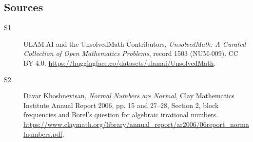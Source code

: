 \documentclass[11pt]{article}
\begin{document}
\subsection{Sources}
\begin{description}
\item[\hypertarget{source:1503:1}{S1}] ULAM.AI and the UnsolvedMath Contributors, \emph{UnsolvedMath: A Curated Collection of Open Mathematics Problems}, record 1503 (NUM-009). CC BY 4.0. \url{https://huggingface.co/datasets/ulamai/UnsolvedMath}.
\item[\hypertarget{source:1503:2}{S2}] Davar Khoshnevisan, \emph{Normal Numbers are Normal}, Clay Mathematics Institute Annual Report 2006, pp. 15 and 27--28, Section 2, block frequencies and Borel's question for algebraic irrational numbers. \url{https://www.claymath.org/library/annual_report/ar2006/06report_normalnumbers.pdf}.
\end{description}
\label{end:1503}
\end{document}
